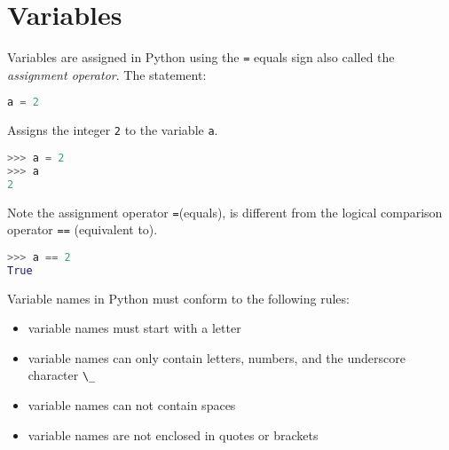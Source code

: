 \documentclass{book}
\providecommand{\tightlist}{%
      \setlength{\itemsep}{0pt}\setlength{\parskip}{0pt}}
\newcommand{\passthrough}[1]{#1}
\begin{document}
    
        \hypertarget{variables}{%
\section{Variables}\label{variables}}
    




    
        Variables are assigned in Python using the \passthrough{\lstinline!=!}
equals sign also called the \emph{assignment operator}. The statement:

\begin{lstlisting}[language=Python]
a = 2
\end{lstlisting}

Assigns the integer \passthrough{\lstinline!2!} to the variable
\passthrough{\lstinline!a!}.
    




    
        \begin{lstlisting}[language=Python]
>>> a = 2
>>> a
2
\end{lstlisting}
    




    
        Note the assignment operator \passthrough{\lstinline!=!}(equals), is
different from the logical comparison operator
\passthrough{\lstinline!==!} (equivalent to).
    




    
        \begin{lstlisting}[language=Python]
>>> a == 2
True
\end{lstlisting}
    




    
        Variable names in Python must conform to the following rules:

\begin{itemize}
\tightlist
\item
  variable names must start with a letter
\item
  variable names can only contain letters, numbers, and the underscore
  character \passthrough{\lstinline!\_!}
\item
  variable names can not contain spaces
\item
  variable names are not enclosed in quotes or brackets
\end{itemize}
    
\end{document}
